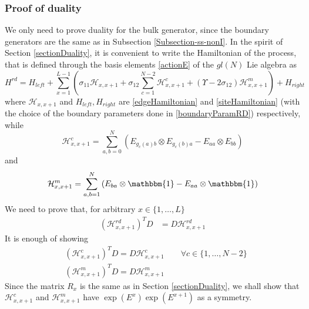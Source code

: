 \documentclass[10pt]{article}
\numberwithin{equation}{section}
\numberwithin{equation}{subsection}
\begin{document}
\subsubsection{Proof of duality}
We only need to prove duality for the bulk generator, since the boundary generators are the same as in Subsection \ref{Subsection-ss-nonI}. 
In the spirit of Section \ref{sectionDuality}, it is convenient to write the Hamiltonian of the process, that is defined through the basis elements \eqref{actionE} of the $gl(N)$ Lie algebra as 
\begin{equation}
	H^{rd}=H_{left}+\sum_{x=1}^{L-1}\left(\sigma_{11}\mathcal{H}_{x,x+1}+\sigma_{12}\sum_{c=1}^{N-2}\mathcal{H}_{x,x+1}^{c}+(\Upsilon-2\sigma_{12})\mathcal{H}_{x,x+1}^{m}\right)+H_{right}
\end{equation}
where $\mathcal{H}_{x,x+1}$ and $H_{left},H_{right}$ are \eqref{edgeHamiltonian}  and \eqref{siteHamiltonian} (with the choice of the boundary parameters done in \eqref{boundaryParamRD}) respectively, while
\begin{equation}
	\mathcal{H}_{x,x+1}^{c}=\sum_{a,b=0}^{N}\left(E_{g_{c}(a)b}\otimes E_{g_{c}(b)a}-E_{aa}\otimes E_{bb}\right)
\end{equation}
and 
\begin{equation}
	\mathcal{H}_{x,x+1}^{m}=\sum_{a,b=1}^{N}\left(E_{ba}\otimes \mathbbm{1}-E_{aa}\otimes \mathbbm{1}\right)
\end{equation}
We need to prove that, for arbitrary $x\in\{1,\ldots,L\}$
\begin{align}
	(\mathcal{H}_{x,x+1}^{rd})^{T}D&=D\mathcal{H}_{x,x+1}^{rd}\label{edgeDualityRelationRD}
\end{align}
It is enough of showing 
\begin{align}
	&(\mathcal{H}_{x,x+1}^{c})^{T}D=D\mathcal{H}_{x,x+1}^{c}\qquad \forall c\in \{1,\ldots,N-2\}\label{cDualityRelation}\\
	&(\mathcal{H}_{x,x+1}^{m})^{T}D=D\mathcal{H}_{x,x+1}^{m}\label{mDualityRelation}
\end{align}
Since the matrix $R_{x}$ is the same as in Section \ref{sectionDuality}, we shall show that $\mathcal{H}_{x,x+1}^{c}$ and $\mathcal{H}_{x,x+1}^{m}$ have $\exp{(E^{x})}\exp{(E^{x+1})}$ as a symmetry. 
\end{document}
